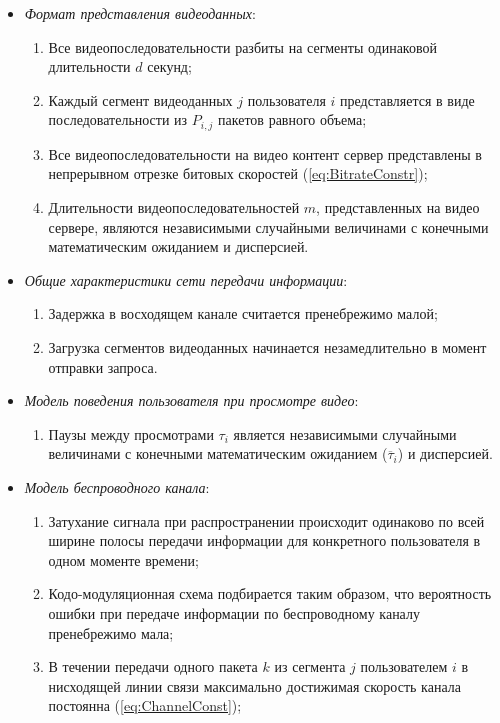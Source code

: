 \begin{itemize}
	\item \textit{Формат представления видеоданных}:
		\begin{enumerate}
			\item Все видеопоследовательности разбиты на сегменты одинаковой длительности $d$ секунд;
			\item Каждый сегмент видеоданных $j$ пользователя $i$ представляется в виде последовательности из $P_{i,j}$ пакетов равного объема;
			\item Все видеопоследовательности на видео контент сервер представлены в непрерывном отрезке битовых скоростей (\ref{eq:BitrateConstr});
			\item Длительности видеопоследовательностей $m$, представленных на видео сервере, являются независимыми случайными величинами с конечными математическим ожиданием и дисперсией.
		\end{enumerate}
	\item \textit{Общие характеристики сети передачи информации}:
		\begin{enumerate}
			\item Задержка в восходящем канале считается пренебрежимо малой;
			\item Загрузка сегментов видеоданных начинается незамедлительно в момент отправки запроса.
		\end{enumerate}
	\item \textit{Модель поведения пользователя при просмотре видео}:
		\begin{enumerate}
			\item Паузы между просмотрами $\tau_i$ является независимыми случайными величинами с конечными математическим ожиданием ($\overline{\tau}_i$) и дисперсией.
		\end{enumerate}
	\item \textit{Модель беспроводного канала}:
		\begin{enumerate}
			\item Затухание сигнала при распространении происходит одинаково по всей ширине полосы передачи информации для конкретного пользователя в одном моменте времени;
			\item Кодо-модуляционная схема подбирается таким образом, что вероятность ошибки при передаче информации по беспроводному каналу пренебрежимо мала;
			\item В течении передачи одного пакета $k$ из сегмента $j$ пользователем $i$ в нисходящей линии связи максимально достижимая скорость канала постоянна (\ref{eq:ChannelConst});

\end{enumerate}
\end{itemize}
